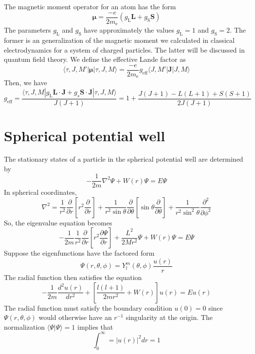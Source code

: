 \begin{example}
The magnetic moment operator for an atom has the form
\[\bm{\mu} = \frac{-e}{2m_{\mathrm{e}} } (g_{\mathrm{L}}\bm{L} + g_{\mathrm{S}} \bm{S})\]
The parameters $g_{\mathrm{L}}$ and $g_{\mathrm{S}}$ have approximately the
values $g_{\mathrm{L}} = 1$ and $g_{\mathrm{S}} = 2$. The former is an generalization of the magnetic moment we calculated in classical electrodynamics for a system of charged particles. The latter will be discussed in quantum field theory.
We define the effective Lande factor as
\[\langle \tau,J,M' | \bm{\mu} | \tau,J,M \rangle = \frac{-e}{2m_{\mathrm{e}} } g_{\mathrm{eff}} \langle J,M' | \bm{J} | J,M \rangle\]
Then, we have
\[g_{\mathrm{eff}} = \frac{\langle \tau,J,M | g_{\mathrm{L}}\bm{L}\cdot\bm{J} + g_s \bm{S}\cdot\bm{J} | \tau,J,M \rangle}{J(J+1)} = 1 + \frac{J(J+1)- L(L+1) + S(S+1)}{2J(J+1)}\]
\end{example}

\section{Spherical potential well}
The stationary states of a particle in the spherical potential well are determined by
\[-\frac{1}{2m}\nabla^2 \Psi  + W(r) \Psi = E\Psi \]
In spherical coordinates, 
\[\nabla^2 = \frac{1}{r^2} \frac{\partial}{\partial r} \left [ r^2\frac{\partial}{\partial r} \right ] + \frac{1}{r^2\sin\theta} \frac{\partial}{\partial \theta} \left [\sin\theta \frac{\partial}{\partial \theta} \right ] + \frac{1}{r^2\sin^2\theta} \frac{\partial^2}{\partial\phi^2}\]
So, the eigenvalue equation becomes
\[-\frac{1}{2m} \frac{1}{r^2} \frac{\partial}{\partial r} \left [ r^2\frac{\partial \Psi}{\partial r}\right ]  + \frac{L^2}{2Mr^2} \Psi + W(r)\Psi = E\Psi\]
Suppose the eigenfunctions have the factored form
\[\Psi(r,\theta,\phi) = Y_l^m(\theta,\phi) \frac{u(r)}{r}\]
The radial function then satisfies the equation
\[-\frac{1}{2m} \frac{d^2 u(r)}{dr^2} + \left[ \frac{l(l+1)}{2mr^2} + W(r)\right]u(r) = Eu(r)\]
The radial function must satisfy the boundary condition $u(0) = 0$ since $\Psi(r,\theta,\phi)$ would otherwise have an $r^{-1}$ singularity at the origin. The normalization $\langle \Psi | \Psi \rangle = 1$ implies that
\[\int_0^{\infty} = |u(r)|^2 dr = 1\]

